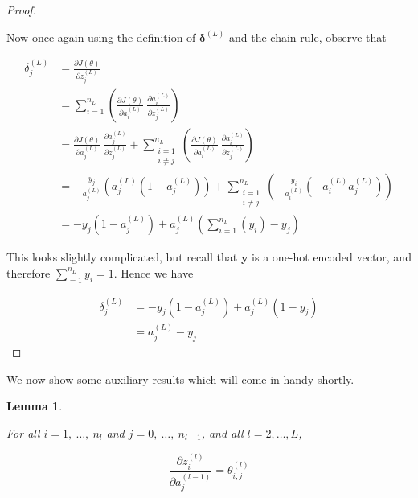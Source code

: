 \documentclass{article}[11pt]
\newtheorem{lemma}{Lemma}
\begin{document}
\begin{proof}
\begin{itemize}
            \end{itemize}
            
            Now once again using the definition of $\boldsymbol{\delta}^{(L)}$ and the chain rule, observe that
            
            $$ \begin{aligned}
            \delta^{(L)}_j &= \frac{\partial J(\theta)}{\partial z^{(L)}_j} \\
            &= \sum_{i=1}^{n_L} \left( \frac{\partial J(\theta)}{\partial a^{(L)}_i} \ \frac{\partial a^{(L)}_i}{\partial z^{(L)}_j} \right) \\
            &= \frac{\partial J(\theta)}{\partial a^{(L)}_j} \ \frac{\partial a^{(L)}_j}{\partial z^{(L)}_j} + \sum_{\substack{i=1 \\ i \neq j}}^{n_L} \left( \frac{\partial J(\theta)}{\partial a^{(L)}_i} \ \frac{\partial a^{(L)}_i}{\partial z^{(L)}_j} \right) \\
            &= - \frac{y_j}{a^{(L)}_j} \left( a^{(L)}_j (1 - a^{(L)}_j) \right) + \sum_{\substack{i=1 \\ i \neq j}}^{n_L} \left( - \frac{y_i}{a^{(L)}_i} \left(- a^{(L)}_i a^{(L)}_j \right) \right) \\
            &= - y_j (1 - a^{(L)}_j) + a^{(L)}_j \left( \sum_{i=1}^{n_L} \left( y_i \right) - y_j \right)
            \end{aligned} $$
            
            This looks slightly complicated, but recall that $\mathbf{y}$ is a one-hot encoded vector, and therefore $\sum_{=1}^{n_L} y_i = 1$. Hence we have
            
            $$ \begin{aligned}
            \delta^{(L)}_j &= - y_j (1 - a^{(L)}_j) + a^{(L)}_j (1 - y_j) \\
            &= a^{(L)}_j - y_j
            \end{aligned} $$
            
        \end{proof}
    
        
        We now show some auxiliary results which will come in handy shortly.
        
        
        \begin{lemma} \label{thm:dz_da}
            
            For all $i = 1, \ \ldots, \ n_l$ and $j = 0, \ \ldots, \ n_{l-1}$, and all $l = 2, \ldots, L$,
            
            $$
            \frac{\partial z^{(l)}_i}{\partial a^{(l-1)}_j} = \theta^{(l)}_{i,j}
            $$
            
        \end{lemma}
        
\end{document}
